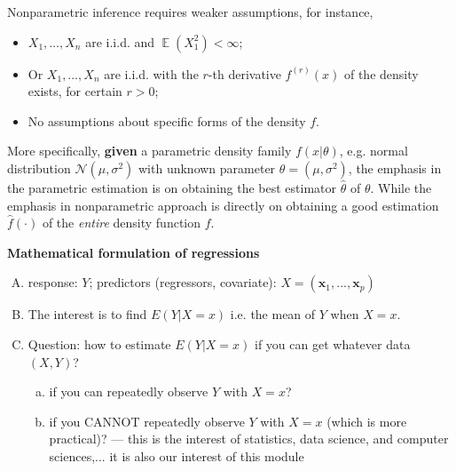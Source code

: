 \documentclass[19pt,landscaoe]{article}
\DeclareMathOperator{\E}{\mathbb{E}}
\begin{document}
\begin{minipage}{.9\textwidth}
    \Large

Nonparametric inference requires weaker assumptions, for instance, 
\vfill
\begin{itemize}
\item $X_1,\dots,X_n$ are i.i.d. and $\E(X_1^2)<\infty$;
\item Or $X_1,\dots,X_n$ are i.i.d. with the $r$-th derivative $f^{(r)}(x)$ of the density exists, for certain $r>0$;
\item No assumptions about specific forms of the density $f$.
\end{itemize}
More specifically, {\bf given} a parametric density family $f(x|\theta)$, e.g. normal distribution $\mathcal{N}(\mu,\sigma^2)$ with unknown parameter $\theta=(\mu,\sigma^2)$, the emphasis in the parametric estimation is on obtaining the best estimator $\hat{\theta}$ of $\theta$. While the emphasis in nonparametric approach is directly on obtaining a good estimation $\hat{f}(\cdot)$ of the {\it entire} density function $f$.
\end{minipage}

\newpage
{\LARGE\centerline{\textbf{Mathematical formulation of regressions}}}
\vskip25pt
\Large
\begin{minipage}{.9\textwidth}
    \begin{enumerate}[(A)]
        \item response: $Y$; predictors (regressors, covariate): $X = (\mathbf{x}_1, ..., \mathbf{x}_p) $
        \item The interest is to find
        $
         E(Y|X=x)
        $
        i.e. the mean of $ Y$ when $ X =x$.
        \item Question: how to estimate $E(Y|X=x)$ if you can get whatever data $(X, Y)$?
        \begin{enumerate}[(a)]
        \item if you can repeatedly observe $ Y$ with $ X = x$?
        \item if you CANNOT repeatedly observe $ Y$ with $ X = x$ (which is more practical)?  --- this is the interest of statistics, data science, and computer sciences,... it is also our interest of this module
        
        
        \end{enumerate}
        
        \end{enumerate}
        
\end{minipage}
\end{document}
